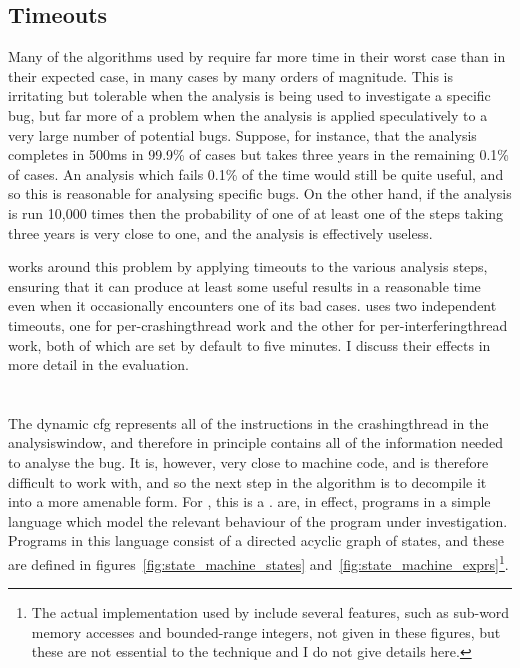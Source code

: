 \subsection{Timeouts}

Many of the algorithms used by {\technique} require far more time in
their worst case than in their expected case, in many cases by many
orders of magnitude.  This is irritating but tolerable when the
analysis is being used to investigate a specific bug, but far more of
a problem when the analysis is applied speculatively to a very large
number of potential bugs.  Suppose, for instance, that the analysis
completes in 500ms in 99.9\% of cases but takes three years in the
remaining 0.1\% of cases.  An analysis which fails 0.1\% of the time
would still be quite useful, and so this is reasonable for analysing
specific bugs.  On the other hand, if the analysis is run 10,000 times
then the probability of one of at least one of the steps taking three
years is very close to one, and the analysis is effectively useless.

{\Technique} works around this problem by applying timeouts to the
various analysis steps, ensuring that it can produce at least some
useful results in a reasonable time even when it occasionally
encounters one of its bad cases.  {\Implementation} uses two
independent timeouts, one for per-\gls{crashingthread} work and the
other for per-\gls{interferingthread} work, both of which are set by
default to five minutes.  I discuss their effects in more detail in
the evaluation.

\section{\STateMachines}
\label{sect:derive:state_machines}

The dynamic \gls{cfg} represents all of the instructions in the
\gls{crashingthread} in the \gls{analysiswindow}, and therefore in
principle contains all of the information needed to analyse the bug.
It is, however, very close to machine code, and is therefore difficult
to work with, and so the next step in the algorithm is to decompile it
into a more amenable form.  For {\technique}, this is a
{\StateMachine}.  {\STateMachines} are, in effect, programs in a
simple language which model the relevant behaviour of the program
under investigation.  Programs in this language consist of a directed
acyclic graph of states, and these are defined in
figures~\ref{fig:state_machine_states}
and~\ref{fig:state_machine_exprs}\footnote{The actual implementation
  used by {\implementation} include several features, such as sub-word
  memory accesses and bounded-range integers, not given in these
  figures, but these are not essential to the {\technique} technique
  and I do not give details here.}.

